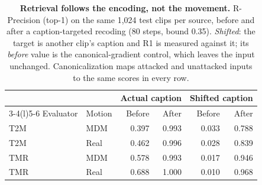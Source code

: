\begin{table}[t]
\centering\footnotesize\setlength{\tabcolsep}{4.5pt}
\caption{\textbf{Retrieval follows the encoding, not the movement.} R-Precision (top-1) on the same 1,024 test clips per source, before and after a caption-targeted recoding (80 steps, bound 0.35). \emph{Shifted}: the target is another clip's caption and R1 is measured against it; its \emph{before} value is the canonical-gradient control, which leaves the input unchanged. Canonicalization maps attacked and unattacked inputs to the same scores in every row.}\label{tab:retrieval}
\begin{tabular}{@{}llrrrr@{}}\toprule
&&\multicolumn{2}{c}{Actual caption}&\multicolumn{2}{c}{Shifted caption}\\
\cmidrule(lr){3-4}\cmidrule(l){5-6}
Evaluator&Motion&Before&After&Before&After\\\midrule
T2M~\cite{guo2022}&MDM&0.397&0.993&0.033&0.788\\
T2M~\cite{guo2022}&Real&0.462&0.996&0.028&0.839\\
TMR~\cite{tmr2023}&MDM&0.578&0.993&0.017&0.946\\
TMR~\cite{tmr2023}&Real&0.688&1.000&0.010&0.968\\
\bottomrule\end{tabular}\end{table}
